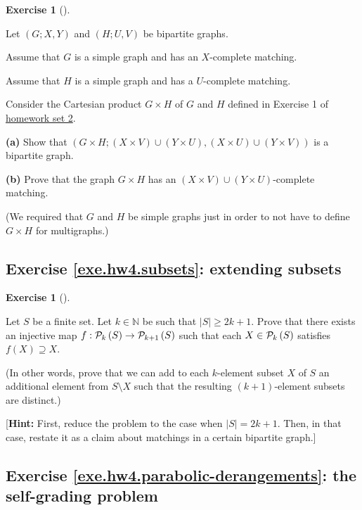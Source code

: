 \documentclass[numbers=enddot,12pt,final,onecolumn,notitlepage]{scrartcl}%
\newcounter{exer}
\theoremstyle{definition}
\newtheorem{exmp}[exer]{Exercise}
\newenvironment{exercise}[1][]
{\begin{exmp}[#1]\begin{leftbar}}
{\end{leftbar}\end{exmp}}
\newcommand{\NN}{\mathbb{N}}
\newcommand{\powset}[2][]{\ifthenelse{\equal{#2}{}}{\mathcal{P}\left(#1\right)}{\mathcal{P}_{#1}\left(#2\right)}}
\newcommand{\abs}[1]{\left| #1 \right|}
\newcommand{\tup}[1]{\left( #1 \right)}
\begin{document}
\begin{exercise} \label{exe.hw4.matching-product}
Let $\tup{G; X, Y}$ and $\tup{H; U, V}$ be bipartite graphs.

Assume that $G$ is a simple graph and has an $X$-complete matching.

Assume that $H$ is a simple graph and has a $U$-complete matching.

Consider the Cartesian product $G \times H$ of $G$ and $H$
defined in Exercise 1 of
\href{http://www-users.math.umn.edu/~dgrinber/5707s17/hw2s.pdf}{homework set 2}.

\textbf{(a)} Show that
$\tup{G \times H; \tup{X \times V} \cup \tup{Y \times U},
                  \tup{X \times U} \cup \tup{Y \times V}}$
is a bipartite graph.

\textbf{(b)} Prove that the graph $G \times H$ has an
$\tup{X \times V} \cup \tup{Y \times U}$-complete matching.
\end{exercise}

(We required that $G$ and $H$ be simple graphs just in order to not
have to define $G \times H$ for multigraphs.)

\subsection{Exercise \ref{exe.hw4.subsets}: extending subsets}

\begin{exercise} \label{exe.hw4.subsets}
Let $S$ be a finite set.
Let $k \in \NN$ be such that $\abs{S} \geq 2k+1$.
Prove that there exists an injective map
$f : \powset[k]{S} \to \powset[k+1]{S}$ such that
each $X \in \powset[k]{S}$ satisfies
$f \tup{X} \supseteq X$.

(In other words, prove that we can add to each $k$-element subset
$X$ of $S$ an additional element from $S \setminus X$ such that the
resulting $\tup{k+1}$-element subsets are distinct.)

[\textbf{Hint:} First, reduce the problem to the case when
$\abs{S} = 2k+1$.
Then, in that case, restate it as a claim about matchings in a
certain bipartite graph.]
\end{exercise}

\subsection{Exercise \ref{exe.hw4.parabolic-derangements}:
the self-grading problem}
\end{document}
